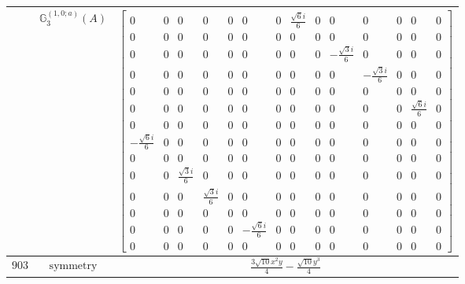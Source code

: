 \documentclass[fleqn,8pt,landscape]{jsarticle}
\begin{document}
\begin{longtable}{ccc}
$  $ & $ \mathbb{G}_{3}^{(1,0;a)}(A) $ & $ \begin{bmatrix} 0 & 0 & 0 & 0 & 0 & 0 & 0 & \frac{\sqrt{6} i}{6} & 0 & 0 & 0 & 0 & 0 & 0 \\ 0 & 0 & 0 & 0 & 0 & 0 & 0 & 0 & 0 & 0 & 0 & 0 & 0 & 0 \\ 0 & 0 & 0 & 0 & 0 & 0 & 0 & 0 & 0 & - \frac{\sqrt{3} i}{6} & 0 & 0 & 0 & 0 \\ 0 & 0 & 0 & 0 & 0 & 0 & 0 & 0 & 0 & 0 & - \frac{\sqrt{3} i}{6} & 0 & 0 & 0 \\ 0 & 0 & 0 & 0 & 0 & 0 & 0 & 0 & 0 & 0 & 0 & 0 & 0 & 0 \\ 0 & 0 & 0 & 0 & 0 & 0 & 0 & 0 & 0 & 0 & 0 & 0 & \frac{\sqrt{6} i}{6} & 0 \\ 0 & 0 & 0 & 0 & 0 & 0 & 0 & 0 & 0 & 0 & 0 & 0 & 0 & 0 \\ - \frac{\sqrt{6} i}{6} & 0 & 0 & 0 & 0 & 0 & 0 & 0 & 0 & 0 & 0 & 0 & 0 & 0 \\ 0 & 0 & 0 & 0 & 0 & 0 & 0 & 0 & 0 & 0 & 0 & 0 & 0 & 0 \\ 0 & 0 & \frac{\sqrt{3} i}{6} & 0 & 0 & 0 & 0 & 0 & 0 & 0 & 0 & 0 & 0 & 0 \\ 0 & 0 & 0 & \frac{\sqrt{3} i}{6} & 0 & 0 & 0 & 0 & 0 & 0 & 0 & 0 & 0 & 0 \\ 0 & 0 & 0 & 0 & 0 & 0 & 0 & 0 & 0 & 0 & 0 & 0 & 0 & 0 \\ 0 & 0 & 0 & 0 & 0 & - \frac{\sqrt{6} i}{6} & 0 & 0 & 0 & 0 & 0 & 0 & 0 & 0 \\ 0 & 0 & 0 & 0 & 0 & 0 & 0 & 0 & 0 & 0 & 0 & 0 & 0 & 0 \end{bmatrix} $ \\ \hline
$ 903 $ & $ \text{symmetry} $ & $ \frac{3 \sqrt{10} x^{2} y}{4} - \frac{\sqrt{10} y^{3}}{4} $ \\

\end{longtable}
\end{document}
